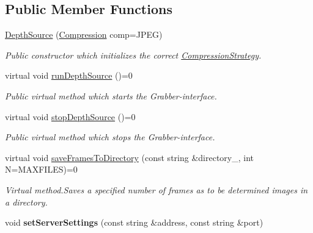 \subsection*{Public Member Functions}
\begin{DoxyCompactItemize}
\item 
\hypertarget{class_depth_source_a391f09ef6480e4243001381ab36c5d6b}{\hyperlink{class_depth_source_a391f09ef6480e4243001381ab36c5d6b}{Depth\+Source} (\hyperlink{_compression_strategy_8h_a56a83bf6847f4801f4205eb4be237ccf}{Compression} comp=J\+P\+E\+G)}\label{class_depth_source_a391f09ef6480e4243001381ab36c5d6b}

\begin{DoxyCompactList}\small\item\em Public constructor which initializes the correct \hyperlink{class_compression_strategy}{Compression\+Strategy}. \end{DoxyCompactList}\item 
\hypertarget{class_depth_source_a5d30215425a5816c488121bd9d770909}{virtual void \hyperlink{class_depth_source_a5d30215425a5816c488121bd9d770909}{run\+Depth\+Source} ()=0}\label{class_depth_source_a5d30215425a5816c488121bd9d770909}

\begin{DoxyCompactList}\small\item\em Public virtual method which starts the Grabber-\/interface. \end{DoxyCompactList}\item 
\hypertarget{class_depth_source_a524c199a0eabfec128d55dc676015f8d}{virtual void \hyperlink{class_depth_source_a524c199a0eabfec128d55dc676015f8d}{stop\+Depth\+Source} ()=0}\label{class_depth_source_a524c199a0eabfec128d55dc676015f8d}

\begin{DoxyCompactList}\small\item\em Public virtual method which stops the Grabber-\/interface. \end{DoxyCompactList}\item 
virtual void \hyperlink{class_depth_source_a9e15edc06570770976693b32ef7c5226}{save\+Frames\+To\+Directory} (const string \&directory\+\_\+, int N=M\+A\+X\+F\+I\+L\+E\+S)=0
\begin{DoxyCompactList}\small\item\em Virtual method.\+Saves a specified number of frames as to be determined images in a directory. \end{DoxyCompactList}\item 
\hypertarget{class_depth_source_ada5c09eba4cf325eea481e5acaefef76}{void {\bfseries set\+Server\+Settings} (const string \&address, const string \&port)}\label{class_depth_source_ada5c09eba4cf325eea481e5acaefef76}

\end{DoxyCompactItemize}
